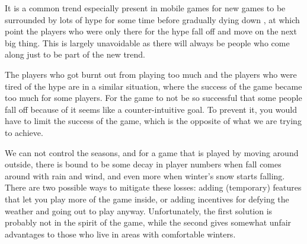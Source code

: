 It is a common trend especially present in mobile games for new games to be surrounded by lots of hype  for some time before gradually dying down , at which point the players who were only there for the hype fall off and move on the next big thing. This is largely unavoidable as there will always be people who come along just to be part of the new trend.

The players who got burnt out from playing too much and the players who were tired of the hype are in a similar situation, where the success of the game became too much for some players. For the game to not be so successful that some people fall off because of it seems like a counter-intuitive goal. To prevent it, you would have to limit the success of the game, which is the opposite of what we are trying to achieve.

We can not control the seasons, and for a game that is played by moving around outside, there is bound to be some decay in player numbers when fall comes around with rain and wind, and even more when winter's snow starts falling. There are two possible ways to mitigate these losses: adding (temporary) features that let you play more of the game inside, or adding incentives for defying the weather and going out to play anyway. Unfortunately, the first solution is probably not in the spirit of the game, while the second gives somewhat unfair advantages to those who live in areas with comfortable winters. 

